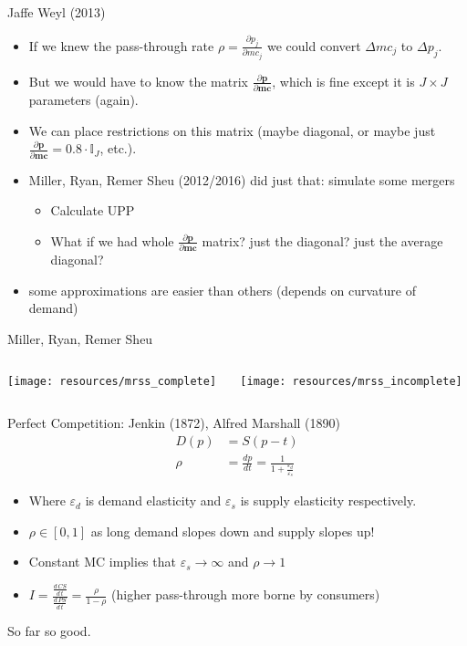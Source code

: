 \begin{frame}{Jaffe Weyl (2013)}
\begin{itemize}
\item If we knew the \alert{pass-through rate} $\rho = \frac{\partial p_j}{\partial mc_j}$ we could convert $\Delta mc_j$ to $\Delta p_j$.
\item But we would have to know the \alert{matrix} $\frac{\partial \mathbf{p}}{\partial \mathbf{mc}}$, which is fine except it is $J \times J$ parameters (again).
\item We can place restrictions on this matrix (maybe diagonal, or maybe just  $\frac{\partial \mathbf{p}}{\partial \mathbf{mc}}=0.8 \cdot \mathbb{I}_J$, etc.).
\item Miller, Ryan, Remer Sheu (2012/2016) did just that: simulate some mergers
\begin{itemize}
    \item Calculate UPP
    \item What if we had whole $\frac{\partial \mathbf{p}}{\partial \mathbf{mc}}$ matrix? just the diagonal? just the average diagonal?
\end{itemize}
\item some approximations are easier than others (depends on curvature of demand)
\end{itemize}
\end{frame}


\begin{frame}{Miller, Ryan, Remer Sheu}
\begin{columns}
\begin{column}{0.5\textwidth}
\texttt{[image: resources/mrss\_complete]}
\end{column}
\begin{column}{0.5\textwidth}
\texttt{[image: resources/mrss\_incomplete]}
\end{column}
\end{columns}
\end{frame}


\begin{frame}{Perfect Competition: Jenkin (1872), Alfred Marshall (1890)}
\begin{align*}
D(p) &= S(p-t)\\
\rho&= \frac{d p}{d t} = \frac{1}{1 + \frac{\varepsilon_d}{\varepsilon_s}}
\end{align*}

\begin{itemize}
\item Where $\varepsilon_d$ is \alert{demand elasticity} and $\varepsilon_s$ is \alert{supply elasticity} respectively.\\
\item $\rho \in [0,1]$ as long demand slopes down and supply slopes up!
\item Constant MC implies that $\varepsilon_s \rightarrow \infty$ and $\rho \rightarrow 1$
\item $I = \frac{\frac{d\, CS}{d\, t}}{\frac{d\, PS}{d\, t}} = \frac{\rho}{1-\rho}$ (higher pass-through more borne by consumers)
\end{itemize}
So far so good.
\end{frame}


